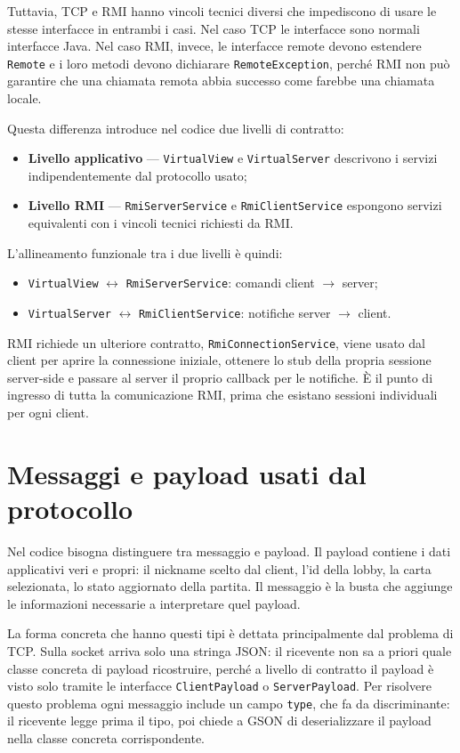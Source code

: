 \documentclass[11pt,a4paper]{article}
\begin{document}
Tuttavia, TCP e RMI hanno vincoli tecnici diversi che impediscono di usare le stesse interfacce
in entrambi i casi.
Nel caso TCP le interfacce sono normali interfacce Java.
Nel caso RMI, invece, le interfacce remote devono estendere \texttt{Remote} e i loro metodi
devono dichiarare \texttt{RemoteException}, perché RMI non può garantire che una chiamata
remota abbia successo come farebbe una chiamata locale.

Questa differenza introduce nel codice due livelli di contratto:
\begin{itemize}
    \item \textbf{Livello applicativo} --- \texttt{VirtualView} e \texttt{VirtualServer}
    descrivono i servizi indipendentemente dal protocollo usato;
    \item \textbf{Livello RMI} --- \texttt{RmiServerService} e \texttt{RmiClientService}
    espongono servizi equivalenti con i vincoli tecnici richiesti da RMI.
\end{itemize}

L'allineamento funzionale tra i due livelli è quindi:
\begin{itemize}
    \item \texttt{VirtualView} $\leftrightarrow$ \texttt{RmiServerService}: comandi client
    $\rightarrow$ server;
    \item \texttt{VirtualServer} $\leftrightarrow$ \texttt{RmiClientService}: notifiche server
    $\rightarrow$ client.
\end{itemize}

RMI richiede un ulteriore contratto, \texttt{RmiConnectionService}, viene usato dal client per aprire la connessione iniziale, ottenere lo stub della propria sessione
server-side e passare al server il proprio callback per le notifiche.
È il punto di ingresso di tutta la comunicazione RMI, prima che esistano sessioni individuali
per ogni client.

\section{Messaggi e payload usati dal protocollo}

Nel codice bisogna distinguere tra messaggio e payload.
Il payload contiene i dati applicativi veri e propri: il nickname scelto dal client,
l'id della lobby, la carta selezionata, lo stato aggiornato della partita.
Il messaggio è la busta che aggiunge le informazioni necessarie a interpretare quel payload.

La forma concreta che hanno questi tipi è dettata principalmente dal problema di TCP.
Sulla socket arriva solo una stringa JSON: il ricevente non sa a priori quale classe
concreta di payload ricostruire, perché a livello di contratto il payload è visto solo
tramite le interfacce \texttt{ClientPayload} o \texttt{ServerPayload}.
Per risolvere questo problema ogni messaggio include un campo \texttt{type}, che fa da
discriminante: il ricevente legge prima il tipo, poi chiede a GSON di deserializzare
il payload nella classe concreta corrispondente.
\end{document}
